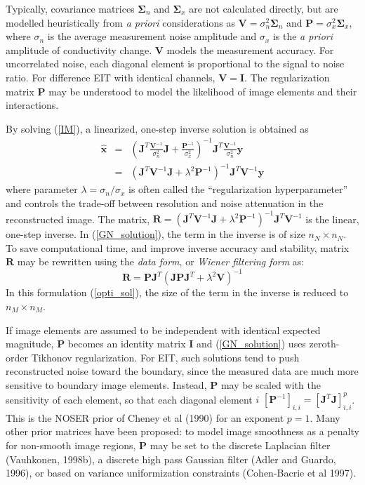\documentclass[12pt]{iopart}
\newcommand{\xH}{\mbox{$\mathbf{\hat x}$}}
\newcommand{\yB}{\mbox{$\mathbf{y}$}}
\newcommand{\RB}{\mbox{$\mathbf{R}$}}
\newcommand{\IB}{\mbox{$\mathbf{I}$}}
\newcommand{\JB}{\mbox{$\mathbf{J}$}}
\renewcommand{\PB}{\mbox{$\mathbf{P}$}}
\newcommand{\VB}{\mbox{$\mathbf{V}$}}
\newcommand{\SG}{\mbox{${\boldsymbol \Sigma}$}}
\begin{document}
Typically,  covariance matrices
$\SG_n$ and $\SG_x$ are not calculated directly, but
are modelled heuristically from {\em a priori}
considerations as 
 $\VB = \sigma_n^{2}\SG_n$
 and
 $\PB = \sigma_x^{2}\SG_x$,
where $\sigma_n$ is the average measurement noise amplitude and
$\sigma_x$ is the {\em a priori} amplitude of conductivity change.
$\VB$ models the measurement accuracy. For uncorrelated noise,
each diagonal element is proportional to the signal to noise
ratio. For difference EIT with identical channels, $\VB=\IB$. The
regularization matrix $\PB$ may be understood to model the
likelihood of image elements and their interactions.

By solving (\ref{IM}), a linearized, one-step inverse solution is
obtained as
\begin{eqnarray}\label{GN_solution}
\xH&=&\left(
    \JB^T \frac{\VB^{-1}}{\sigma_n^2} \JB 
     +
    \frac{\PB^{-1}}{\sigma_x^2} 
    \right)^{-1}
    \JB^T \frac{\VB^{-1}}{\sigma_n^2}\yB
\nonumber \\
   &=&\left(
    \JB^T \VB^{-1} \JB + \lambda^2 \PB^{-1}
    \right)^{-1}
    \JB^T \VB^{-1} \yB
\end{eqnarray}
where parameter  $\lambda=\sigma_n/\sigma_x$ is
often called the ``regularization hyperparameter'' and
controls the trade-off
between resolution and noise attenuation in the reconstructed
image.
The matrix,
$\RB=\left(\JB^T\VB^{-1}\JB+\lambda^2\PB^{-1}\right)^{-1}\JB^T\VB^{-1}$
is the linear, one-step inverse.
In (\ref{GN_solution}), the term in the inverse is of size
$n_N\times n_N$. To save computational time, and improve inverse
accuracy and stability, matrix $\RB$ may be rewritten 
using the {\em data form}, or {\em Wiener filtering form} as:
\begin{equation}\label{opti_sol}
 \RB =\PB\JB^T
    \left(
       \JB\PB\JB^T+\lambda^2\VB
   \right)^{-1}
\end{equation}
In this formulation (\ref{opti_sol}), the size of the term in the
inverse is reduced to $n_M\times n_M$.

If image elements are assumed to be independent with identical
expected magnitude, $\PB$ becomes an identity matrix $\IB$ and
(\ref{GN_solution}) uses zeroth-order Tikhonov regularization. For
EIT, such solutions tend to push reconstructed noise toward the
boundary, since the measured data are much more sensitive to
boundary image elements. Instead, $\PB$ may be scaled with the
sensitivity of each element, so that each diagonal element $i$ 
$[\PB^{-1}]_{i,i} = \left[ \JB^T \JB
\right]_{i,i}^p$. This is the NOSER prior of Cheney et al (1990)
for an exponent $p=1$. Many other prior matrices have been
proposed: to model image smoothness as a penalty for non-smooth
image regions, $\PB$ may be set to the discrete Laplacian filter
(Vauhkonen, 1998b), a discrete high pass Gaussian filter (Adler
and Guardo, 1996), or based on variance uniformization
constraints (Cohen-Bacrie et al 1997).
\end{document}
